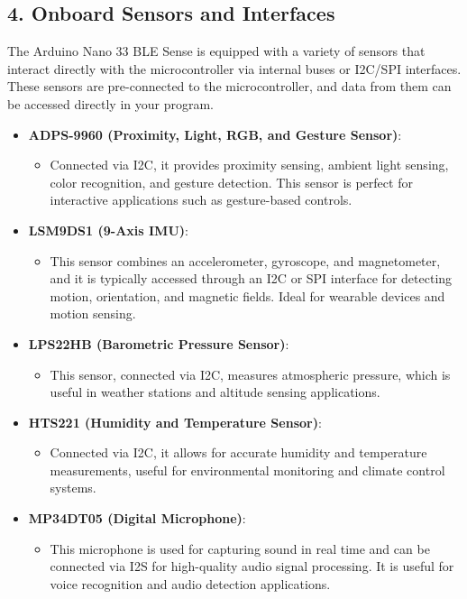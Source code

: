 	\subsection*{4. Onboard Sensors and Interfaces}
	The Arduino Nano 33 BLE Sense is equipped with a variety of sensors that interact directly with the microcontroller via internal buses or I2C/SPI interfaces. These sensors are pre-connected to the microcontroller, and data from them can be accessed directly in your program.
	
	\begin{itemize}
		\item \textbf{ADPS-9960 (Proximity, Light, RGB, and Gesture Sensor)}: 
		\begin{itemize}
			\item Connected via I2C, it provides proximity sensing, ambient light sensing, color recognition, and gesture detection. This sensor is perfect for interactive applications such as gesture-based controls.
		\end{itemize}
		
		\item \textbf{LSM9DS1 (9-Axis IMU)}: 
		\begin{itemize}
			\item This sensor combines an accelerometer, gyroscope, and magnetometer, and it is typically accessed through an I2C or SPI interface for detecting motion, orientation, and magnetic fields. Ideal for wearable devices and motion sensing.
		\end{itemize}
		
		\item \textbf{LPS22HB (Barometric Pressure Sensor)}:
		\begin{itemize}
			\item This sensor, connected via I2C, measures atmospheric pressure, which is useful in weather stations and altitude sensing applications.
		\end{itemize}
		
		\item \textbf{HTS221 (Humidity and Temperature Sensor)}:
		\begin{itemize}
			\item Connected via I2C, it allows for accurate humidity and temperature measurements, useful for environmental monitoring and climate control systems.
		\end{itemize}
		
		\item \textbf{MP34DT05 (Digital Microphone)}:
		\begin{itemize}
			\item This microphone is used for capturing sound in real time and can be connected via I2S for high-quality audio signal processing. It is useful for voice recognition and audio detection applications.
		\end{itemize}
	\end{itemize}
	
